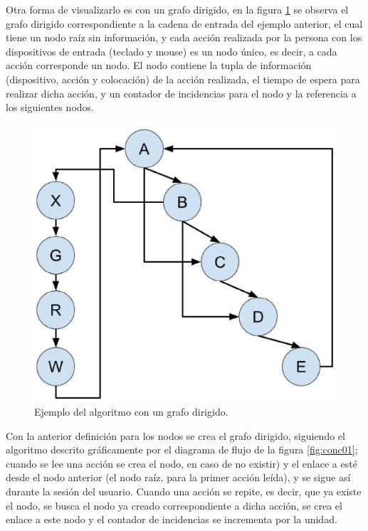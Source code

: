 
Otra forma de visualizarlo es con un grafo dirigido, en la figura
 \ref{fig:alg02} se observa el grafo dirigido correspondiente a la cadena
 de entrada del ejemplo anterior, el cual tiene un nodo ra\'iz sin 
 informaci\'on, y cada acci\'on realizada por la persona con los dispositivos
 de entrada (teclado y mouse) es un nodo \'unico, es decir, a cada acci\'on 
 corresponde un nodo. El nodo contiene la tupla de informaci\'on (dispositivo,
 acci\'on y colocaci\'on) de la acci\'on realizada, el tiempo de espera para
 realizar dicha acci\'on, y un contador de incidencias para el nodo y la
 referencia a los siguientes nodos.
 
\begin{figure}[h!]
\centering
\includegraphics[width=0.5\columnwidth]{chap4/Imagenes/algoritmo2.eps}
\caption{Ejemplo del algoritmo con un grafo dirigido.}
\label{fig:alg02}
\end{figure} 
 
Con la anterior definici\'on para los nodos se crea el grafo dirigido,
 siguiendo el algoritmo descrito gr\'aficamente por el diagrama de flujo 
 de la figura \ref{fig:conc01}; cuando se lee una acci\'on se crea el nodo,
 en caso de no existir) y el enlace a est\'e desde el nodo anterior (el nodo
 ra\'iz, para la primer acci\'on le\'ida), y se sigue as\'i durante la sesi\'on
 del usuario. Cuando una acci\'on se repite, es decir, que ya existe el nodo,
 se busca el nodo ya creado correspondiente a dicha acci\'on, se crea el enlace 
 a este nodo y el contador de incidencias se incrementa por la unidad.


